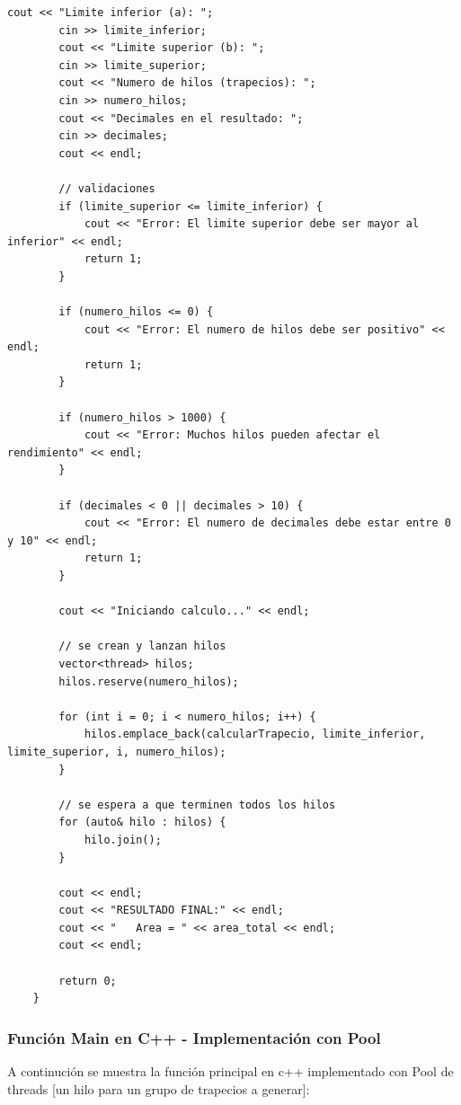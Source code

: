 \begin{lstlisting}[style=cpp-style, caption={Función Main en cpp - Primera implementación}]
        cout << "Limite inferior (a): ";
        cin >> limite_inferior;
        cout << "Limite superior (b): ";
        cin >> limite_superior;
        cout << "Numero de hilos (trapecios): ";
        cin >> numero_hilos;
        cout << "Decimales en el resultado: ";
        cin >> decimales;
        cout << endl;
        
        // validaciones
        if (limite_superior <= limite_inferior) {
            cout << "Error: El limite superior debe ser mayor al inferior" << endl;
            return 1;
        }
        
        if (numero_hilos <= 0) {
            cout << "Error: El numero de hilos debe ser positivo" << endl;
            return 1;
        }
        
        if (numero_hilos > 1000) {
            cout << "Error: Muchos hilos pueden afectar el rendimiento" << endl;
        }
    
        if (decimales < 0 || decimales > 10) {
            cout << "Error: El numero de decimales debe estar entre 0 y 10" << endl;
            return 1;
        }
        
        cout << "Iniciando calculo..." << endl;
        
        // se crean y lanzan hilos
        vector<thread> hilos;
        hilos.reserve(numero_hilos);
        
        for (int i = 0; i < numero_hilos; i++) {
            hilos.emplace_back(calcularTrapecio, limite_inferior, limite_superior, i, numero_hilos);
        }
        
        // se espera a que terminen todos los hilos
        for (auto& hilo : hilos) {
            hilo.join();
        }
    
        cout << endl;
        cout << "RESULTADO FINAL:" << endl;
        cout << "   Area = " << area_total << endl;
        cout << endl;
        
        return 0;
    }
\end{lstlisting}


\subsubsection {Función Main en C++ - Implementación con Pool}

A continución se muestra la función principal en c++ implementado con Pool de threads [un hilo para un grupo de trapecios a generar]:

